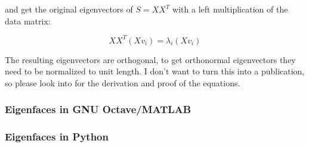 and get the original eigenvectors of $S = X X^{T}$ with a left multiplication of the data matrix:

\begin{equation}
	X X^{T} (X v_{i}) = \lambda_{i} (X v_{i})
\end{equation}

The resulting eigenvectors are orthogonal, to get orthonormal eigenvectors they need to be normalized to unit length. I don't want to turn this into a publication, so please look into \cite{Duda2001} for the derivation and proof of the equations.

\ifx\python\undefined 
	\subsubsection{Eigenfaces in GNU Octave/MATLAB}
\else
 \subsubsection{Eigenfaces in Python}
\fi


\label{ssection:example_eigenfaces}

